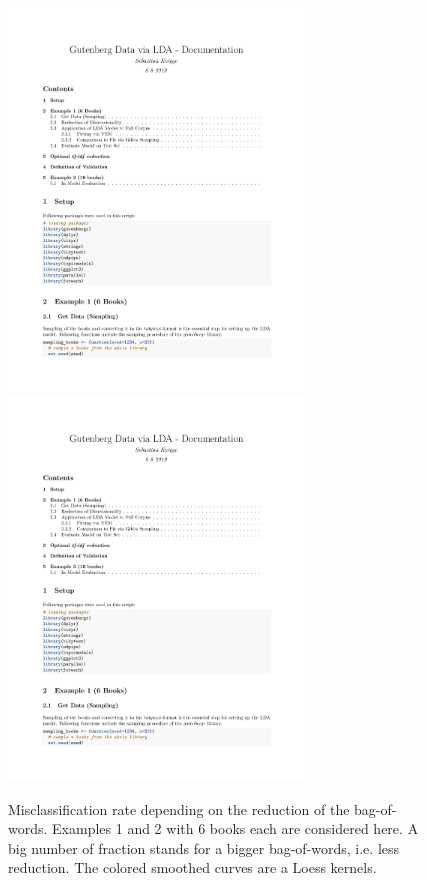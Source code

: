 \documentclass[11pt,a4paper]{article}
\begin{document}
\begin{figure}[h]
	\centering
	\includegraphics[page=14, trim=73 405 60 70,clip,width=0.7\textwidth]{LDA_Documentation.pdf}
	\includegraphics[page=16, trim=85 275 50 200,clip,width=0.7\textwidth]{LDA_Documentation.pdf}

	\caption{Misclassification rate depending on the reduction of the bag-of-words. Examples 1 and 2 with 6 books each are considered here. A big number of fraction stands for a bigger bag-of-words, i.e. less reduction. The colored smoothed curves are a Loess kernels.}
	\label{misc.rate_tfidf}
\end{figure}
\end{document}
